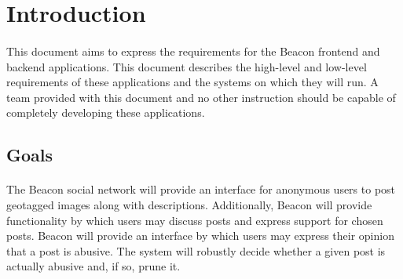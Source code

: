 \section{Introduction}
\paragraph*{}
    This document aims to express the requirements for the Beacon frontend and backend
    applications. This document describes the high-level and low-level requirements
    of these applications and the systems on which they will run. A team provided with
    this document and no other instruction should be capable of completely developing
    these applications.

\subsection{Goals}
\paragraph*{}
    The Beacon social network will provide an interface for anonymous users to post
    geotagged images along with descriptions. Additionally, Beacon will provide
    functionality by which users may discuss posts and express support for chosen
    posts. Beacon will provide an interface by which users may express their opinion
    that a post is abusive. The system will robustly decide whether a given post
    is actually abusive and, if so, prune it.

